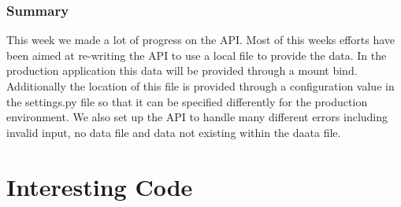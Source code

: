 \documentclass[onecolumn, draftclsnofoot,10pt, compsoc]{article}
\begin{document}
			\subsubsection{Summary} This week we made a lot of progress on the API. Most of this weeks efforts have been aimed at re-writing the API to use a local file to provide the data. In the production application this data will be provided through a mount bind. Additionally the location of this file is provided through a configuration value in the settings.py file so that it can be specified differently for the production environment. We also set up the API to handle many different errors including invalid input, no data file and data not existing within the daata file.\\
			
\section{Interesting Code}
\end{document}
